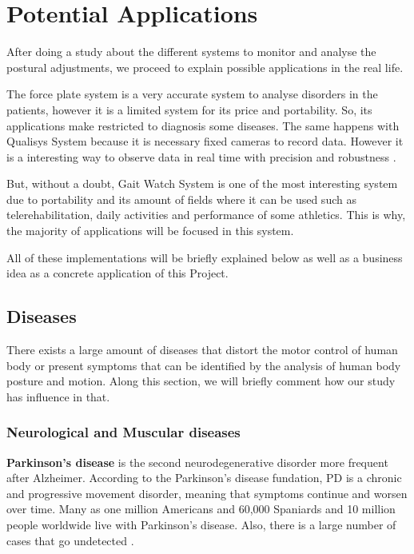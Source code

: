 \chapter{Potential Applications}
\label{ch:Applications}

After doing a study about the different systems to monitor and analyse the postural adjustments, we proceed to explain possible applications in the real life.

The force plate system is a very accurate system to analyse disorders in the patients, however it is a limited system for its price and portability. So, its applications make restricted to diagnosis some diseases.
The same happens with Qualisys System because it is necessary fixed cameras to record data. However it is a interesting way to observe data in real time with precision and robustness .

But, without a doubt, Gait Watch System is one of the most interesting system due to portability and its amount of fields where it can be used such as telerehabilitation, daily activities and performance of some athletics. This is why, the majority of applications will be focused in this system.

All of these implementations will be briefly explained below as well as a business idea as a concrete application of this Project.

\section{Diseases}
There exists a large amount of diseases that distort the motor control of human body or present symptoms that can be identified by the analysis of human body posture and motion. Along this section,  we will briefly comment how our study has influence in that.

\subsection{Neurological and Muscular diseases}
\textbf{Parkinson’s disease} is the second neurodegenerative disorder more frequent after Alzheimer\cite{AppPD}. According to the Parkinson’s disease fundation, PD is a chronic and progressive movement disorder, meaning that symptoms continue and worsen over time\cite{pdf}.
Many as one million Americans and 60,000 Spaniards and 10 million people worldwide live with Parkinson’s disease. Also, there is a large number of cases that go undetected \cite{A.Olivares2013}.

